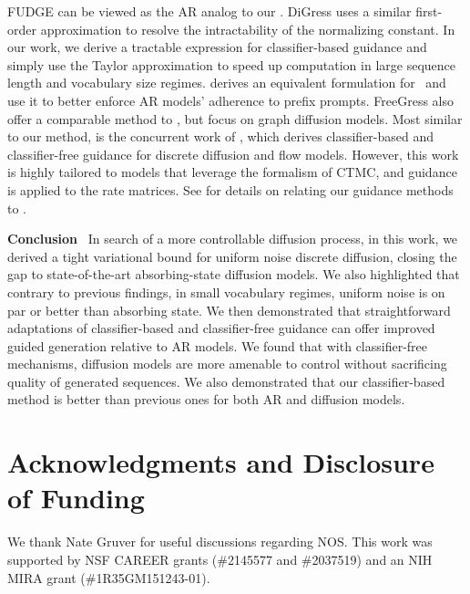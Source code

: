 \documentclass{article} %
\begin{document}
FUDGE \citep{yang2021fudge} can be viewed as the AR analog to our \cbg.
DiGress \citep{vignac2022digress} uses a similar first-order approximation to resolve the intractability of the normalizing constant.
In our work, we derive a tractable expression for classifier-based guidance and simply use the Taylor approximation to speed up computation in large sequence length and vocabulary size regimes.
\citet{sanchez2023stay} derives an equivalent formulation for \cfg~and use it to better enforce AR models' adherence to prefix prompts.
FreeGress \citep{ninniri2024classifier} also offer a comparable method to \cfg, but focus on graph diffusion models.
Most similar to our method, is the concurrent work of \citet{nisonoff2024unlocking}, which derives classifier-based and classifier-free guidance for discrete diffusion and flow models.
However, this work is highly tailored to models that leverage the formalism of CTMC, and guidance is applied to the rate matrices.
See  for details on relating our guidance methods to \citet{nisonoff2024unlocking}.

\textbf{Conclusion}~
In search of a more controllable diffusion process, in this work, we derived a tight variational bound for uniform noise discrete diffusion, closing the gap to state-of-the-art absorbing-state diffusion models.
We also highlighted that contrary to previous findings, in small vocabulary regimes, uniform noise is on par or better than absorbing state.
We then demonstrated that straightforward adaptations of classifier-based and classifier-free guidance can offer improved guided generation relative to AR models.
We found that with classifier-free mechanisms, diffusion models are more amenable to control without sacrificing quality of generated sequences.
We also demonstrated that our classifier-based method is better than previous ones for both AR and diffusion models.

\section*{Acknowledgments and Disclosure of Funding}
We thank Nate Gruver for useful discussions regarding NOS. 
This work was supported by NSF CAREER grants (\#2145577 and \#2037519) and an NIH MIRA grant (\#1R35GM151243-01).





\newpage
\appendix
\tableofcontents

\end{document}
